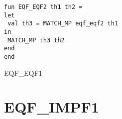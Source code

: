 \IMPLEMENTATION
\begin{holboxed}
\begin{verbatim}
fun EQF_EQF2 th1 th2 =
let
 val th3 = MATCH_MP eqf_eqf2 th1
in
 MATCH_MP th3 th2
end
end
\end{verbatim}
\end{holboxed}

\SEEALSO
EQF\_EQF1

\ENDDOC

\section{EQF\_IMPF1}



\egroup

